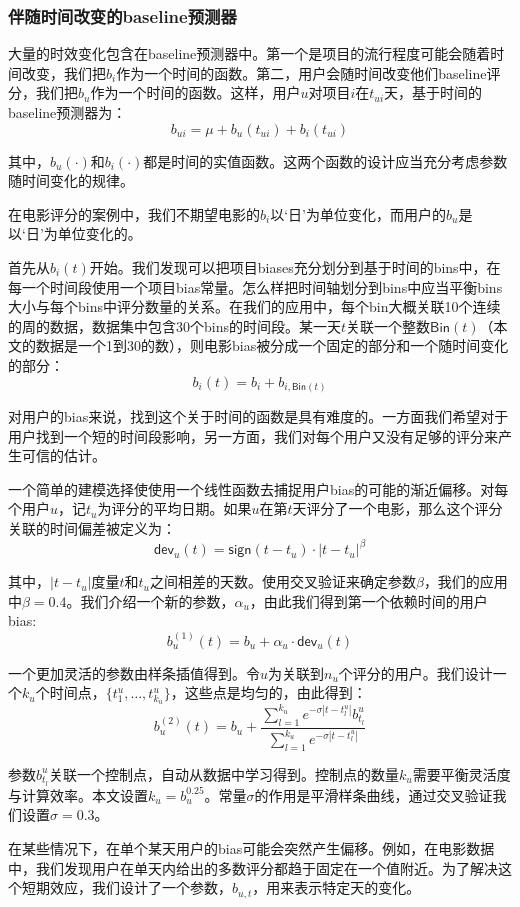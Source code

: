 \documentclass{article}
\begin{document}
 \subsubsection{伴随时间改变的baseline预测器}
 大量的时效变化包含在baseline预测器中。第一个是项目的流行程度可能会随着时间改变，我们把$b_i$作为一个时间的函数。第二，用户会随时间改变他们baseline评分，我们把$b_u$作为一个时间的函数。这样，用户$u$对项目$i$在$t_{ui}$天，基于时间的baseline预测器为：
 $$ b_{ui}=\mu+b_u(t_{ui})+b_i(t_{ui}) $$

 其中，$b_u(\cdot)$和$b_i(\cdot)$都是时间的实值函数。这两个函数的设计应当充分考虑参数随时间变化的规律。

 在电影评分的案例中，我们不期望电影的$b_i$以‘日’为单位变化，而用户的$b_u$是以‘日’为单位变化的。

 首先从$b_i(t)$开始。我们发现可以把项目biases充分划分到基于时间的bins中，在每一个时间段使用一个项目bias常量。怎么样把时间轴划分到bins中应当平衡bins大小与每个bins中评分数量的关系。在我们的应用中，每个bin大概关联10个连续的周的数据，数据集中包含30个bins的时间段。某一天$t$关联一个整数$\mathsf{Bin}(t)$（本文的数据是一个1到30的数），则电影bias被分成一个固定的部分和一个随时间变化的部分：
 $$ b_i(t)=b_i+b_{i,\mathsf{Bin}(t)} $$

 对用户的bias来说，找到这个关于时间的函数是具有难度的。一方面我们希望对于用户找到一个短的时间段影响，另一方面，我们对每个用户又没有足够的评分来产生可信的估计。

 一个简单的建模选择使使用一个线性函数去捕捉用户bias的可能的渐近偏移。对每个用户$u$，记$t_u$为评分的平均日期。如果$u$在第$t$天评分了一个电影，那么这个评分关联的时间偏差被定义为：
 $$ \mathsf{dev}_u(t)=\mathsf{sign}(t-t_u)\cdot|t-t_u|^{\beta} $$

 其中，$|t-t_u|$度量$t$和$t_u$之间相差的天数。使用交叉验证来确定参数$\beta$，我们的应用中$\beta=0.4$。我们介绍一个新的参数，$\alpha_u$，由此我们得到第一个依赖时间的用户bias:
 $$ b_u^{(1)}(t)=b_u+\alpha_u\cdot\mathsf{dev}_u(t) $$

 一个更加灵活的参数由样条插值得到。令$u$为关联到$n_u$个评分的用户。我们设计一个$k_u$个时间点，$\{t_1^u,\dots,t_{k_u}^u\}$，这些点是均匀的，由此得到：
 $$ b_u^{(2)}(t)=b_u+\frac{\mathop{\sum}_{l=1}^{k_u}e^{-\sigma|t-t_l^u|}b_{t_l}^u}{\mathop{\sum}_{l=1}^{k_u}e^{-\sigma|t-t_l^u|}} $$

 参数$b_{t_l}^u$关联一个控制点，自动从数据中学习得到。控制点的数量$k_u$需要平衡灵活度与计算效率。本文设置$k_u=b_u^{0.25}$。常量$\sigma$的作用是平滑样条曲线，通过交叉验证我们设置$\sigma=0.3$。

 在某些情况下，在单个某天用户的bias可能会突然产生偏移。例如，在电影数据中，我们发现用户在单天内给出的多数评分都趋于固定在一个值附近。为了解决这个短期效应，我们设计了一个参数，$b_{u,t}$，用来表示特定天的变化。
\end{document}
